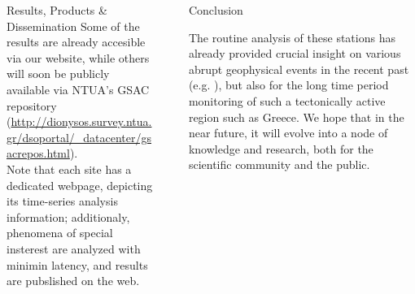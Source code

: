 \documentclass[final,a0,portrait]{beamer}
\newlength{\sepwid}
\newlength{\onecolwid}
\begin{document}
\begin{frame}[t]
\begin{columns}[t]
\begin{column}{\onecolwid}
\begin{block}{Results, Products \& Dissemination}
{Some of the results are already accesible via our website, while others will soon be publicly available via NTUA's GSAC 
\cite{gsac} repository (\url{http://dionysos.survey.ntua.gr/dsoportal/_datacenter/gsacrepos.html}).\\

Note that each site has a dedicated webpage, depicting its time-series analysis information; additionaly, 
phenomena of special insterest are analyzed with minimin latency, and results are pubslished on the web.
}
\end{block}


\end{column} %

\begin{column}{\sepwid}\end{column} %


\begin{column}{\onecolwid} %


\begin{block}{Conclusion}
{\small
The routine analysis of these stations has already provided crucial insight on various abrupt geophysical events in the recent past (e.g. \cite{GRL:GRL50066}),
but also for the long time period  monitoring of such a tectonically active region such as Greece.
We hope that in the near future, it will evolve into a node of knowledge and research, 
both for the scientific community and the public.

}
\end{block}
\end{column}
\end{columns}
\end{frame}
\end{document}
